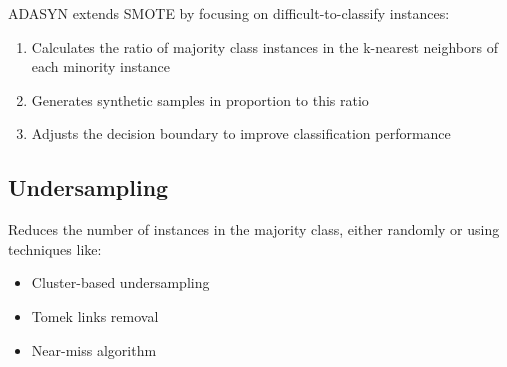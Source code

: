 \documentclass[
  letterpaper,
  DIV=11,
  numbers=noendperiod]{scrreprt}
\providecommand{\tightlist}{%
  \setlength{\itemsep}{0pt}\setlength{\parskip}{0pt}}\usepackage{longtable,booktabs,array}
\begin{document}
ADASYN extends SMOTE by focusing on difficult-to-classify instances:

\begin{enumerate}
\def\labelenumi{\arabic{enumi}.}
\tightlist
\item
  Calculates the ratio of majority class instances in the k-nearest
  neighbors of each minority instance
\item
  Generates synthetic samples in proportion to this ratio
\item
  Adjusts the decision boundary to improve classification performance
\end{enumerate}

\subsection{Undersampling}\label{undersampling}

Reduces the number of instances in the majority class, either randomly
or using techniques like:

\begin{itemize}
\tightlist
\item
  Cluster-based undersampling
\item
  Tomek links removal
\item
  Near-miss algorithm
\end{itemize}
\end{document}
